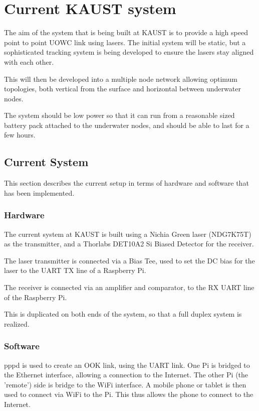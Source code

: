 \section{Current \ac{KAUST} system}
The aim of the system that is being built at \ac{KAUST} is to provide a high
speed point to point \ac{UOWC} link using lasers. The initial system will be
static, but a sophisticated tracking system is being developed to ensure the
lasers stay aligned with each other.

This will then be developed into a multiple node network allowing optimum
topologies, both vertical from the surface and horizontal between underwater
nodes.

The system should be low power so that it can run from a reasonable sized
battery pack attached to the underwater nodes, and should be able to last for
a few hours.

\subsection{Current System}
This section describes the current setup in terms of hardware and software
that has been implemented.

\subsubsection{Hardware}
The current system at \ac{KAUST} is built using a Nichia Green laser (NDG7K75T)
as the transmitter, and a Thorlabs DET10A2 Si Biased Detector for the receiver.

The laser transmitter is connected via a Bias Tee, used to set the DC bias
for the laser to the \ac{UART} TX line of a Raspberry Pi.

The receiver is connected via an amplifier and comparator, to the RX UART
line of the Raspberry Pi.

This is duplicated on both ends of the system, so that a full duplex
system is realized.

\subsubsection{Software}
pppd is used to create an OOK link, using the \ac{UART} link. One Pi is
bridged to the Ethernet interface, allowing a connection to the Internet.
The other Pi (the 'remote') side is bridge to the WiFi interface. A mobile
phone or tablet is then used to connect via WiFi to the Pi. This thus allows
the phone to connect to the Internet.

